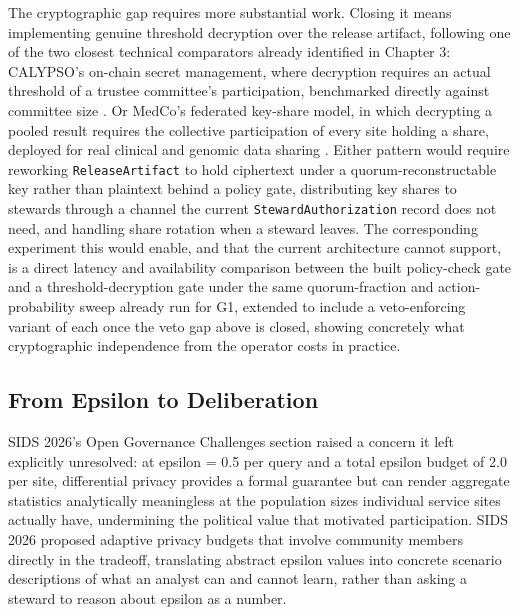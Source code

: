The cryptographic gap requires more substantial work. Closing it means implementing genuine threshold decryption over the release artifact, following one of the two closest technical comparators already identified in Chapter 3: CALYPSO's on-chain secret management, where decryption requires an actual threshold of a trustee committee's participation, benchmarked directly against committee size \cite{kokoriskogias2020}. Or MedCo's federated key-share model, in which decrypting a pooled result requires the collective participation of every site holding a share, deployed for real clinical and genomic data sharing \cite{raisaro2019}. Either pattern would require reworking \texttt{ReleaseArtifact} to hold ciphertext under a quorum-reconstructable key rather than plaintext behind a policy gate, distributing key shares to stewards through a channel the current \texttt{StewardAuthorization} record does not need, and handling share rotation when a steward leaves. The corresponding experiment this would enable, and that the current architecture cannot support, is a direct latency and availability comparison between the built policy-check gate and a threshold-decryption gate under the same quorum-fraction and action-probability sweep already run for G1, extended to include a veto-enforcing variant of each once the veto gap above is closed, showing concretely what cryptographic independence from the operator costs in practice.

\subsection{From Epsilon to Deliberation}

SIDS 2026's Open Governance Challenges section raised a concern it left explicitly unresolved: at epsilon = 0.5 per query and a total epsilon budget of 2.0 per site, differential privacy provides a formal guarantee but can render aggregate statistics analytically meaningless at the population sizes individual service sites actually have, undermining the political value that motivated participation. SIDS 2026 proposed adaptive privacy budgets that involve community members directly in the tradeoff, translating abstract epsilon values into concrete scenario descriptions of what an analyst can and cannot learn, rather than asking a steward to reason about epsilon as a number.

